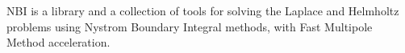 NBI is a library and a collection of tools for solving the Laplace and Helmholtz problems using Nystrom Boundary Integral methods, with Fast Multipole Method acceleration. 